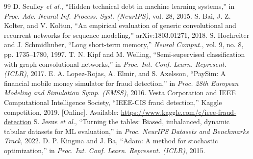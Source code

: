 \documentclass[conference]{IEEEtran}
\begin{document}
\begin{thebibliography}{99}
 D. Sculley \emph{et al.}, ``Hidden technical debt in machine learning systems,'' in \emph{Proc. Adv. Neural Inf. Process. Syst. (NeurIPS)}, vol. 28, 2015.
 S. Bai, J. Z. Kolter, and V. Koltun, ``An empirical evaluation of generic convolutional and recurrent networks for sequence modeling,'' arXiv:1803.01271, 2018.
 S. Hochreiter and J. Schmidhuber, ``Long short-term memory,'' \emph{Neural Comput.}, vol. 9, no. 8, pp. 1735--1780, 1997.
 T. N. Kipf and M. Welling, ``Semi-supervised classification with graph convolutional networks,'' in \emph{Proc. Int. Conf. Learn. Represent. (ICLR)}, 2017.
 E. A. Lopez-Rojas, A. Elmir, and S. Axelsson, ``PaySim: A financial mobile money simulator for fraud detection,'' in \emph{Proc. 28th European Modeling and Simulation Symp. (EMSS)}, 2016.
 Vesta Corporation and IEEE Computational Intelligence Society, ``IEEE-CIS fraud detection,'' Kaggle competition, 2019. [Online]. Available: \url{https://www.kaggle.com/c/ieee-fraud-detection}
 S. Jesus \emph{et al.}, ``Turning the tables: Biased, imbalanced, dynamic tabular datasets for ML evaluation,'' in \emph{Proc. NeurIPS Datasets and Benchmarks Track}, 2022.
 D. P. Kingma and J. Ba, ``Adam: A method for stochastic optimization,'' in \emph{Proc. Int. Conf. Learn. Represent. (ICLR)}, 2015.
\end{thebibliography}
\end{document}
